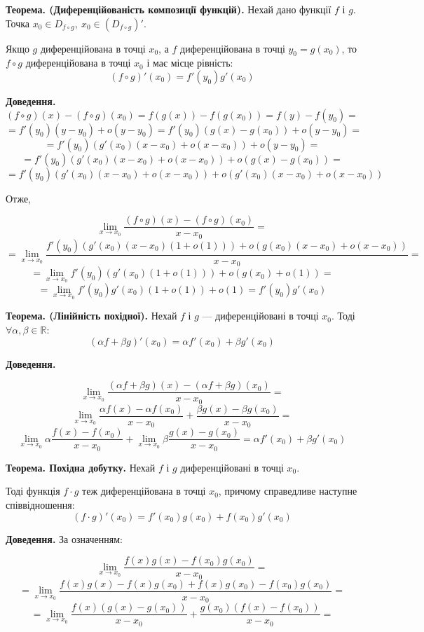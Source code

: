 \documentclass[12pt]{report}
\begin{document}
\vspace{5mm}

\textbf{Теорема. (Диференційованість композиції функцій).}  Нехай дано функції $f$ і $g$. Точка $x_0 \in D_{f \circ g},\ x_0 \in (D_{f \circ g})'$.

Якщо $g$ диференційована в точці $x_0$, а $f$ диференційована в точці $y_0 = g(x_0)$, то $f \circ g$ диференційована в точці $x_0$ і має місце рівність:
$$(f \circ g)' (x_0) = f'(y_0) g'(x_0)$$

\textbf{Доведення.} 
$$(f \circ g) (x) - (f \circ g) (x_0) = f(g(x)) - f(g(x_0)) = f(y) - f(y_0) =$$ 
$$= f'(y_0)(y - y_0) + o(y - y_0) = f'(y_0)(g(x) - g(x_0)) + o(y - y_0) = $$
$$= f'(y_0)(g'(x_0)(x - x_0) + o(x - x_0)) + o(y - y_0) = $$
$$= f'(y_0)(g'(x_0)(x - x_0) + o(x - x_0)) + o(g(x) - g(x_0)) = $$
$$= f'(y_0)(g'(x_0)(x - x_0) + o(x - x_0)) + o(g'(x_0)(x - x_0) + o(x - x_0))$$

Отже,

$$\lim_{x \to x_0} \frac{(f \circ g)(x) - (f \circ g)(x_0)}{x - x_0} = $$
$$=\lim_{x \to x_0}\frac{f'(y_0)(g'(x_0)(x - x_0)(1 + o(1))) + o(g(x_0)(x - x_0) + o(x - x_0))}{x - x_0} = $$
$$=\lim_{x \to x_0}f'(y_0)(g'(x_0)(1 + o(1))) + o(g(x_0) + o(1)) = $$
$$=\lim_{x \to x_0}f'(y_0)g'(x_0)(1 + o(1)) + o(1) = f'(y_0)g'(x_0)$$

\textbf{Теорема. (Лінійність похідної).} Нехай $f$ і $g$ --- диференційовані в точці $x_0$. Тоді $\forall \alpha,\beta \in \mathbb{R}$:
$$(\alpha f + \beta g)' (x_0) = \alpha f'(x_0) + \beta g'(x_0)$$

\textbf{Доведення.} 

$$\lim_{x \to x_0} \frac{(\alpha f + \beta g)(x) - (\alpha f + \beta g)(x_0)}{x - x_0} = $$
$$\lim_{x \to x_0} \frac{ \alpha f(x) - \alpha f(x_0)}{x - x_0} + \frac{\beta g(x) - \beta g (x_0)}{x - x_0} = $$
$$\lim_{x \to x_0} \alpha \frac{ f(x) - f(x_0)}{x - x_0} + \lim_{x \to x_0}\beta \frac{g(x) - g (x_0)}{x - x_0}  = \alpha f'(x_0) + \beta g'(x_0)$$

\textbf{Теорема. Похідна добутку.} Нехай $f$ і $g$ диференційовані в точці $x_0$. 

Тоді функція $f \cdot g$ теж диференційована в точці $x_0$, причому справедливе наступне співвідношення:
$$(f \cdot g)' (x_0) = f'(x_0)g(x_0) + f(x_0) g'(x_0)$$

\textbf{Доведення.} За означенням:

$$\lim_{x \to x_0} \frac{f(x)g(x) - f(x_0)g(x_0)}{x - x_0} = $$
$$= \lim_{x \to x_0} \frac{f(x)g(x) - f(x)g(x_0) + f(x)g(x_0) - f(x_0)g(x_0)}{x - x_0} = $$
$$= \lim_{x \to x_0} \frac{f(x)(g(x) - g(x_0))}{x - x_0} + \frac{g(x_0)(f(x) - f(x_0))}{x - x_0} = $$
\end{document}
